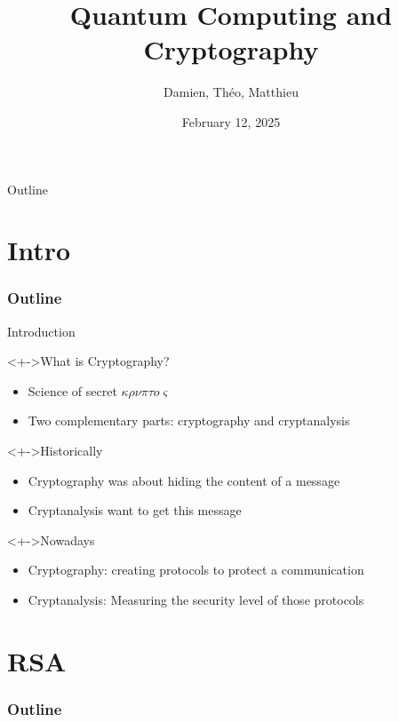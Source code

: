 \documentclass{beamer}
\title{Quantum Computing and Cryptography}
\author{Damien, Théo, Matthieu}
\institute{}
\date{February 12, 2025}
\begin{document}
\begin{frame}
\maketitle
\end{frame}

\begin{frame}{Outline}
\tableofcontents
\end{frame}

\section{Intro}
\begin{frame}
  \frametitle{Outline}
  \tableofcontents[currentsection]
\end{frame}

\begin{frame}{Introduction}
\begin{linenumbers}
	\begin{block}<+->{What is Cryptography?}
		\begin{itemize}
			\item Science of secret $\kappa\rho\nu\pi\tau o\varsigma$ %
			\item Two complementary parts: cryptography and cryptanalysis
		\end{itemize}
	\end{block}
	\begin{block}<+->{Historically}
		\begin{itemize}
			\item Cryptography was about hiding the content of a message %
			\item Cryptanalysis want to get this message
		\end{itemize}
	\end{block}
	\begin{block}<+->{Nowadays}
		\begin{itemize}
			\item Cryptography: creating protocols to protect a communication
			\item Cryptanalysis: Measuring the security level of those protocols
		\end{itemize}
	\end{block}
\end{linenumbers}
\end{frame}

\section{RSA}
\begin{frame}
  \frametitle{Outline}
  \tableofcontents[currentsection]
\end{frame}
\end{document}
